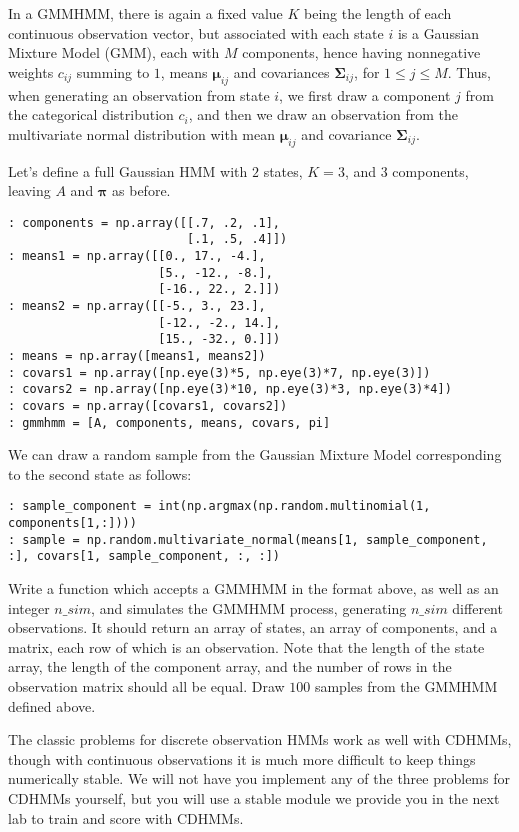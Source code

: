 In a GMMHMM, there is again a fixed value $K$ being the length of each continuous observation vector, but associated with each state $i$ is a Gaussian Mixture Model (GMM), each with $M$ components, hence having nonnegative weights $c_{ij}$ summing to $1$, means $\mathbf{\mu}_{ij}$ and covariances $\mathbf{\Sigma}_{ij}$, for $1 \leq j \leq M$. Thus, when generating an observation from state $i$, we first draw a component $j$ from the categorical distribution $c_{i}$, and then we draw an observation from the multivariate normal distribution with mean $\mathbf{\mu}_{ij}$ and covariance $\mathbf{\Sigma}_{ij}$.

Let's define a full Gaussian HMM with $2$ states, $K = 3$, and $3$ components, leaving $A$ and $\mathbf{\pi}$ as before.
\begin{lstlisting}
: components = np.array([[.7, .2, .1],
                         [.1, .5, .4]])
: means1 = np.array([[0., 17., -4.],
                     [5., -12., -8.],
                     [-16., 22., 2.]])
: means2 = np.array([[-5., 3., 23.],
                     [-12., -2., 14.],
                     [15., -32., 0.]])
: means = np.array([means1, means2])
: covars1 = np.array([np.eye(3)*5, np.eye(3)*7, np.eye(3)])
: covars2 = np.array([np.eye(3)*10, np.eye(3)*3, np.eye(3)*4])
: covars = np.array([covars1, covars2])
: gmmhmm = [A, components, means, covars, pi]
\end{lstlisting}

We can draw a random sample from the Gaussian Mixture Model corresponding to the second state as follows:
\begin{lstlisting}
: sample_component = int(np.argmax(np.random.multinomial(1, components[1,:])))
: sample = np.random.multivariate_normal(means[1, sample_component, :], covars[1, sample_component, :, :])
\end{lstlisting}

\begin{problem}
Write a function which accepts a GMMHMM in the format above, as well as an integer $n\_sim$, and simulates the GMMHMM process, generating $n\_sim$ different observations. It should return an array of states, an array of components, and a matrix, each row of which is an observation. Note that the length of the state array, the length of the component array, and the number of rows in the observation matrix should all be equal. Draw $100$ samples from the GMMHMM defined above.
\end{problem}

The classic problems for discrete observation HMMs work as well with CDHMMs, though with continuous observations it is much more difficult to keep things numerically stable. We will not have you implement any of the three problems for CDHMMs yourself, but you will use a stable module we provide you in the next lab to train and score with CDHMMs.